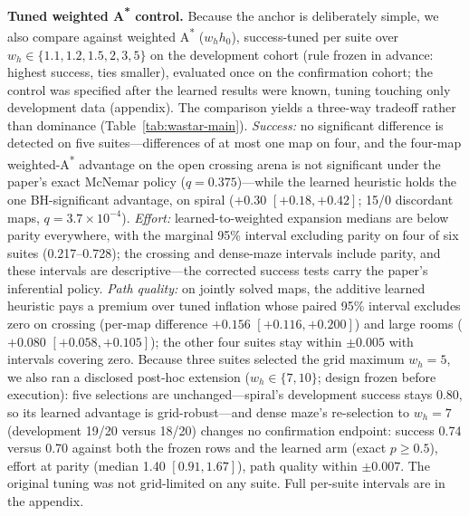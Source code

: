 \documentclass[letterpaper]{article} %
\begin{document}
\textbf{Tuned weighted A\textsuperscript{*} control.} Because the anchor is deliberately simple, we also compare against weighted A\textsuperscript{*} ($w_h h_0$), success-tuned per suite over $w_h \in \{1.1, 1.2, 1.5, 2, 3, 5\}$ on the development cohort (rule frozen in advance: highest success, ties smaller), evaluated once on the confirmation cohort; the control was specified after the learned results were known, tuning touching only development data (appendix). The comparison yields a three-way tradeoff rather than dominance (Table~\ref{tab:wastar-main}). \emph{Success:} no significant difference is detected on five suites---differences of at most one map on four, and the four-map weighted-A\textsuperscript{*} advantage on the open crossing arena is not significant under the paper's exact McNemar policy ($q{=}0.375$)---while the learned heuristic holds the one BH-significant advantage, on spiral ($+0.30$ $[+0.18,+0.42]$; 15/0 discordant maps, $q{=}3.7\times10^{-4}$). \emph{Effort:} learned-to-weighted expansion medians are below parity everywhere, with the marginal 95\% interval excluding parity on four of six suites (0.217--0.728); the crossing and dense-maze intervals include parity, and these intervals are descriptive---the corrected success tests carry the paper's inferential policy. \emph{Path quality:} on jointly solved maps, the additive learned heuristic pays a premium over tuned inflation whose paired 95\% interval excludes zero on crossing (per-map difference $+0.156$ $[+0.116,+0.200]$) and large rooms ($+0.080$ $[+0.058,+0.105]$); the other four suites stay within $\pm 0.005$ with intervals covering zero. Because three suites selected the grid maximum $w_h{=}5$, we also ran a disclosed post-hoc extension ($w_h \in \{7, 10\}$; design frozen before execution): five selections are unchanged---spiral's development success stays 0.80, so its learned advantage is grid-robust---and dense maze's re-selection to $w_h{=}7$ (development 19/20 versus 18/20) changes no confirmation endpoint: success 0.74 versus 0.70 against both the frozen rows and the learned arm (exact $p \geq 0.5$), effort at parity (median 1.40 $[0.91, 1.67]$), path quality within $\pm 0.007$. The original tuning was not grid-limited on any suite. Full per-suite intervals are in the appendix.
\end{document}
